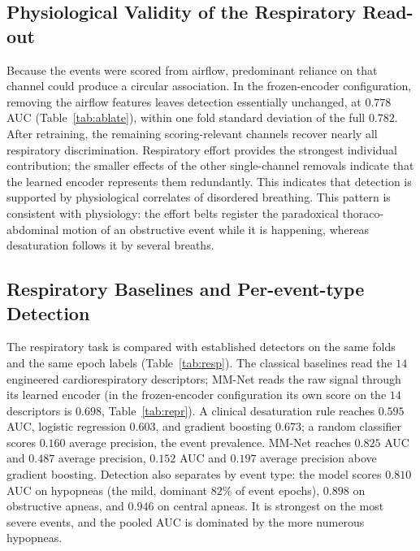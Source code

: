 \documentclass[a4paper,fleqn]{cas-sc}
\newcommand{\mmAuc}{0.825}
\newcommand{\mmAp}{0.487}
\newcommand{\fzAuc}{0.782}
\newcommand{\noflowAuc}{0.778}
\begin{document}
\subsection{Physiological Validity of the Respiratory Read-out}
\label{sec:noflow}
Because the events were scored from airflow, predominant reliance on that channel could
produce a circular association. In the frozen-encoder configuration, removing the airflow features leaves detection essentially unchanged, at $\noflowAuc$ AUC (Table~\ref{tab:ablate}), within one fold standard deviation of the full $\fzAuc$. After retraining, the remaining scoring-relevant channels recover nearly
all respiratory discrimination. Respiratory effort provides the strongest individual contribution;
the smaller effects of the other single-channel removals indicate that the
learned encoder represents them redundantly. This indicates that detection is supported by
physiological correlates of disordered breathing. This pattern is consistent with physiology: the effort belts register the paradoxical thoraco-abdominal motion of an obstructive event while it is happening, whereas desaturation follows it by several breaths.

\subsection{Respiratory Baselines and Per-event-type Detection}
The respiratory task is compared with established detectors on the same folds and the same
epoch labels (Table~\ref{tab:resp}). The classical baselines read the $14$ engineered
cardiorespiratory descriptors; MM-Net reads the raw signal through its learned encoder (in the
frozen-encoder configuration its own score on the $14$ descriptors is $0.698$,
Table~\ref{tab:repr}). A clinical desaturation rule reaches $0.595$ AUC, logistic regression
$0.603$, and gradient boosting $0.673$; a random classifier scores $0.160$ average precision, the
event prevalence. MM-Net reaches $\mmAuc$ AUC and $\mmAp$ average precision, $0.152$ AUC and
$0.197$ average precision above gradient boosting. Detection also separates by event type: the
model scores $0.810$ AUC on hypopneas (the mild, dominant $82\%$ of event epochs), $0.898$ on
obstructive apneas, and $0.946$ on central apneas. It is strongest on the most severe events, and the pooled AUC is dominated by the more numerous hypopneas.
\end{document}

